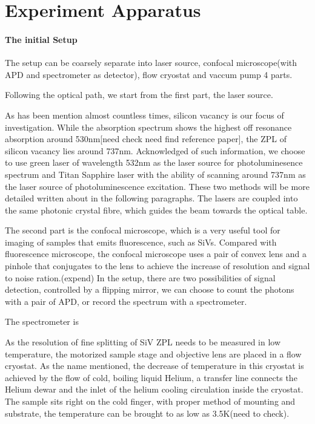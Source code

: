 \section[experiment apparatus]{Experiment Apparatus}

\paragraph{The initial Setup} 

The setup can be coarsely separate into laser source, confocal microscope(with APD and spectrometer as detector), flow cryostat and vaccum pump 4 parts.

Following the optical path, we start from the first part, the laser source.

As has been mention almost countless times, silicon vacancy is our focus of investigation. While the absorption spectrum shows the highest off resonance absorption around 530nm[need check need find reference paper], the ZPL of silicon vacancy lies around 737nm. Acknowledged of such information, we choose to use green laser of wavelength 532nm as the laser source for photoluminesence spectrum and Titan Sapphire laser with the ability of scanning around 737nm as the laser source of photoluminescence excitation. These two methods will be more detailed written about in the following paragraphs.
The lasers are coupled into the same photonic crystal fibre, which guides the beam towards the optical table.

The second part is the confocal microscope, which is a very useful tool for imaging of samples that emits fluorescence, such as SiVs. Compared with fluorescence microscope, the confocal microscope uses a pair of convex lens and a pinhole that conjugates to the lens to achieve the increase of resolution and signal to noise ration.(expend)
In the setup, there are two possibilities of signal detection, controlled by a flipping mirror, we can choose to count the photons with a pair of APD, or record the spectrum with a spectrometer.

The spectrometer is 

As the resolution of fine splitting of SiV ZPL needs to be measured in low temperature, the motorized sample stage and objective lens are placed in a flow cryostat. As the name mentioned, the decrease of temperature in this cryostat is achieved by the flow of cold, boiling liquid Helium, a transfer line connects the Helium dewar and the inlet of the helium cooling circulation inside the cryostat. The sample sits right on the cold finger, with proper method of mounting and substrate, the temperature can be brought to as low as 3.5K(need to check).

